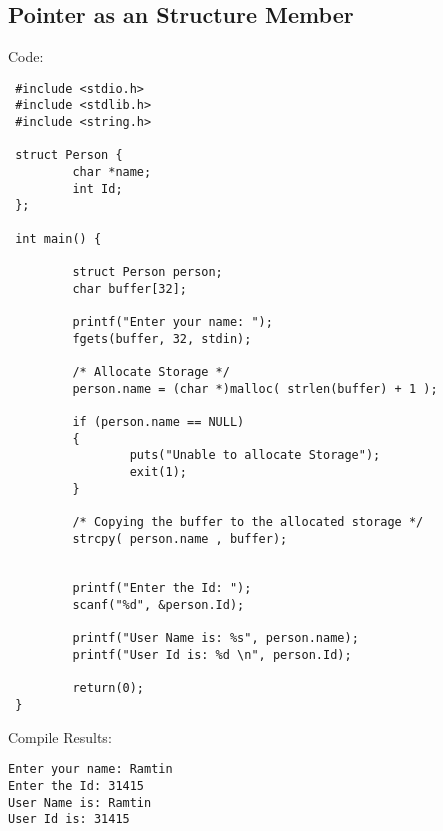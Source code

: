 \subsection{Pointer as an Structure Member}
Code:
\begin{lstlisting} 
 #include <stdio.h>
 #include <stdlib.h>
 #include <string.h>

 struct Person {
         char *name;
         int Id;
 };

 int main() {

         struct Person person;
         char buffer[32];

         printf("Enter your name: ");
         fgets(buffer, 32, stdin);

         /* Allocate Storage */
         person.name = (char *)malloc( strlen(buffer) + 1 );

         if (person.name == NULL)
         {
                 puts("Unable to allocate Storage");
                 exit(1);
         }

         /* Copying the buffer to the allocated storage */
         strcpy( person.name , buffer);


         printf("Enter the Id: ");
         scanf("%d", &person.Id);

         printf("User Name is: %s", person.name);
         printf("User Id is: %d \n", person.Id);

         return(0);
 }

\end{lstlisting}

Compile Results:
\begin{lstlisting} 
Enter your name: Ramtin
Enter the Id: 31415
User Name is: Ramtin
User Id is: 31415
\end{lstlisting}




